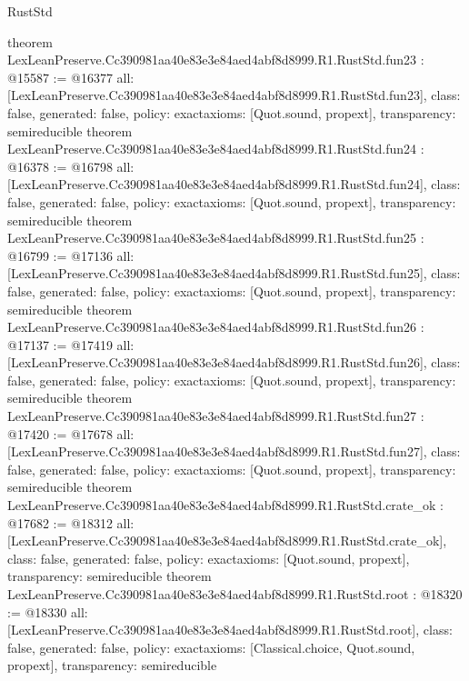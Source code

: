 \begin{lexlean}{RustStd}
\begin{coremodule}
{}
theorem LexLeanPreserve.Cc390981aa40e83e3e84aed4abf8d8999.R1.RustStd.fun23 : @15587 := @16377 {
  all: [LexLeanPreserve.Cc390981aa40e83e3e84aed4abf8d8999.R1.RustStd.fun23],
  class: false,
  generated: false,
  policy: exact{axioms: [Quot.sound, propext]},
  transparency: semireducible
}
theorem LexLeanPreserve.Cc390981aa40e83e3e84aed4abf8d8999.R1.RustStd.fun24 : @16378 := @16798 {
  all: [LexLeanPreserve.Cc390981aa40e83e3e84aed4abf8d8999.R1.RustStd.fun24],
  class: false,
  generated: false,
  policy: exact{axioms: [Quot.sound, propext]},
  transparency: semireducible
}
theorem LexLeanPreserve.Cc390981aa40e83e3e84aed4abf8d8999.R1.RustStd.fun25 : @16799 := @17136 {
  all: [LexLeanPreserve.Cc390981aa40e83e3e84aed4abf8d8999.R1.RustStd.fun25],
  class: false,
  generated: false,
  policy: exact{axioms: [Quot.sound, propext]},
  transparency: semireducible
}
theorem LexLeanPreserve.Cc390981aa40e83e3e84aed4abf8d8999.R1.RustStd.fun26 : @17137 := @17419 {
  all: [LexLeanPreserve.Cc390981aa40e83e3e84aed4abf8d8999.R1.RustStd.fun26],
  class: false,
  generated: false,
  policy: exact{axioms: [Quot.sound, propext]},
  transparency: semireducible
}
theorem LexLeanPreserve.Cc390981aa40e83e3e84aed4abf8d8999.R1.RustStd.fun27 : @17420 := @17678 {
  all: [LexLeanPreserve.Cc390981aa40e83e3e84aed4abf8d8999.R1.RustStd.fun27],
  class: false,
  generated: false,
  policy: exact{axioms: [Quot.sound, propext]},
  transparency: semireducible
}
theorem LexLeanPreserve.Cc390981aa40e83e3e84aed4abf8d8999.R1.RustStd.crate_ok : @17682 := @18312 {
  all: [LexLeanPreserve.Cc390981aa40e83e3e84aed4abf8d8999.R1.RustStd.crate_ok],
  class: false,
  generated: false,
  policy: exact{axioms: [Quot.sound, propext]},
  transparency: semireducible
}
theorem LexLeanPreserve.Cc390981aa40e83e3e84aed4abf8d8999.R1.RustStd.root : @18320 := @18330 {
  all: [LexLeanPreserve.Cc390981aa40e83e3e84aed4abf8d8999.R1.RustStd.root],
  class: false,
  generated: false,
  policy: exact{axioms: [Classical.choice, Quot.sound, propext]},
  transparency: semireducible
}


\end{coremodule}
\end{lexlean}
